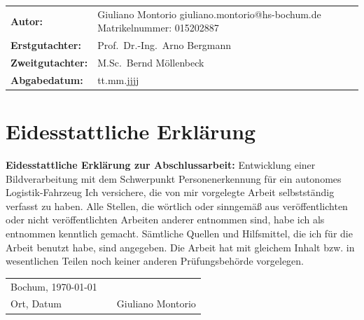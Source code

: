\documentclass[12pt,a4paper,oneside,numbers=noenddot,headsepline,captions=tableheading,toc=bibliography,openany,tikz,margin=5mm]{scrbook}
\begin{document}
\begin{titlepage}
\begin{center}
		\begin{tabular}{x{6cm}p{7.5cm}}
			\rule{0mm}{5ex}
			\textbf{Autor:} & Giuliano Montorio
			\newline giuliano.montorio@hs-bochum.de
			\newline Matrikelnummer: 015202887
			\newline\\
			
			
			\rule{0mm}{5ex}\textbf{Erstgutachter:} & Prof.\ Dr.-Ing.\ Arno Bergmann\\
			\rule{0mm}{2ex}\textbf{Zweitgutachter:} & M.Sc.\ Bernd Möllenbeck \\
			\rule{0mm}{5ex}\textbf{Abgabedatum:} & tt.mm.jjjj\\ 
		\end{tabular} 
	\end{center}
\end{titlepage}

	\onehalfspacing
	\cleardoublepage
	\cleardoublepage
	
	
	
	\chapter*{\textbf{Eidesstattliche Erklärung}}
	\textbf{Eidesstattliche Erklärung zur Abschlussarbeit:}
	\newline
	\newline
	\newline
	\flqq Entwicklung einer Bildverarbeitung mit dem Schwerpunkt Personenerkennung für ein autonomes Logistik-Fahrzeug\frqq
	\newline
	\newline
	\newline
	Ich versichere, die von mir vorgelegte Arbeit selbstständig verfasst zu haben. Alle
	Stellen, die wörtlich oder sinngemäß aus veröffentlichten oder nicht veröffentlichten
	Arbeiten anderer entnommen sind, habe ich als entnommen kenntlich gemacht.
	Sämtliche Quellen und Hilfsmittel, die ich für die Arbeit benutzt habe, sind angegeben.
	Die Arbeit hat mit gleichem Inhalt bzw. in wesentlichen Teilen noch keiner anderen
	Prüfungsbehörde vorgelegen.
	\newline
	\newline
	\newline
	\newline
	\newline
	\newline
	\newline
	\newline
	\begin{center}
		\begin{tabular}[h]{lp{2cm}p{5.5cm}}
			Bochum, \today & & \\
			\cline{1-1}\cline{3-3}
			Ort, Datum& & Giuliano Montorio\\
		\end{tabular}
	\end{center}
	
\end{document}

